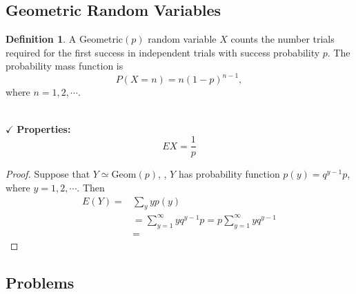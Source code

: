 \documentclass[12pt,a4paper]{article}
\theoremstyle{definition}
\theoremstyle{definition}
\newtheorem*{definition}{Definition}
\theoremstyle{definition}
\theoremstyle{definition}
\theoremstyle{remark}
\theoremstyle{definition}
\newcommand{\ie}{\text{i.e.}}
\begin{document}
\subsection{Geometric Random Variables}
\begin{tcolorbox}[colback=white]
	\begin{definition}
		A Geometric$(p)$ random variable $X$ counts the number trials required for the first success in independent trials with success probability $p$. The probability mass function is \[
		P(X=n)=n(1-p)^{n-1},
		\] where $n=1,2,\cdots$.
	\end{definition}
\end{tcolorbox}\
\\
$\checkmark$ \textbf{Properties:} \[
EX=\frac{1}{p}
\]
\begin{proof}
	Suppose that $Y\simeq\text{Geom}(p)$, \ie, $Y$ has probability function $p(y)=q^{y-1}p$, where $y=1,2,\cdots$. Then \begin{align*}
	E(Y)=&\sum_yyp(y)\\
	&=\sum_{y=1}^{\infty}yq^{y-1}p=p\sum_{y=1}^{\infty}yq^{y-1}\\
	&=
	\end{align*}
\end{proof}

\subsection{Problems}

\begin{tcolorbox}[colback=white]

\end{tcolorbox}
\
\begin{tcolorbox}[colback=white]

\end{tcolorbox}
\
\begin{tcolorbox}[colback=white]

\end{tcolorbox}
\
\begin{tcolorbox}[colback=white]

\end{tcolorbox}
\
\begin{tcolorbox}[colback=white]

\end{tcolorbox}
\
\begin{tcolorbox}[colback=white]

\end{tcolorbox}
\
\begin{tcolorbox}[colback=white]

\end{tcolorbox}
\end{document}
